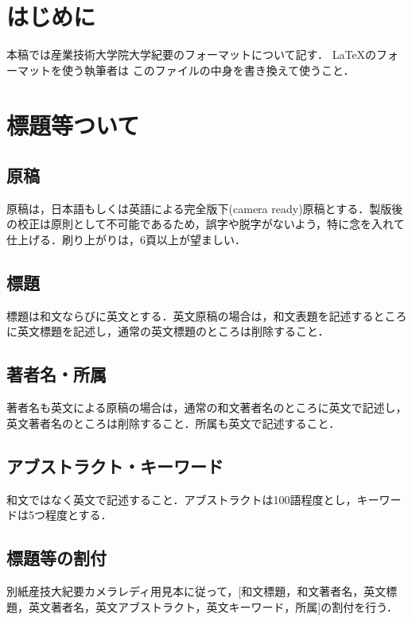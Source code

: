 \documentclass[a4j,twoside]{jarticle}
\begin{document}
\renewcommand{\thefootnote}{*\arabic{footnote}}
\setcounter{footnote}{0}
\begin{multicols}{2} %
\small %
\section{はじめに}
本稿では産業技術大学院大学紀要のフォーマットについて記す．
\LaTeX のフォーマットを使う執筆者は %
このファイルの中身を書き換えて使うこと．

\section{標題等ついて}
\subsection{原稿}
原稿は，日本語もしくは英語による完全版下(camera ready)原稿とする．製版後の校正は原則として不可能であるため，誤字や脱字がないよう，特に念を入れて仕上げる．刷り上がりは，6頁以上が望ましい．

\subsection{標題}
標題は和文ならびに英文とする．英文原稿の場合は，和文表題を記述するところに英文標題を記述し，通常の英文標題のところは削除すること．

\subsection{著者名・所属}
著者名も英文による原稿の場合は，通常の和文著者名のところに英文で記述し，英文著者名のところは削除すること．所属も英文で記述すること．

\subsection{アブストラクト・キーワード}
和文ではなく英文で記述すること．アブストラクトは100語程度とし，キーワードは5つ程度とする．

\subsection{標題等の割付}
別紙産技大紀要カメラレディ用見本に従って，[和文標題，和文著者名，英文標
題，英文著者名，英文アブストラクト，英文キーワード，所属]の割付を行う．


\end{multicols}
\end{document}
